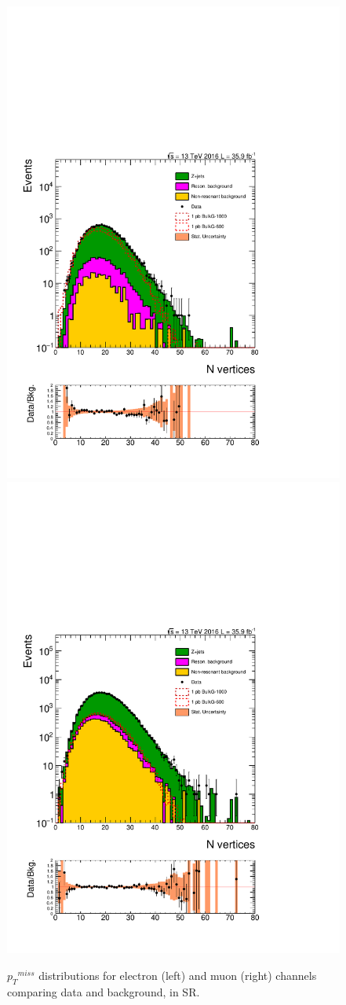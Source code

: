 \begin{figure}[htbp!]
\centering
\includegraphics[width=0.46\linewidth,page=16]{figures/ReMiniSummer16_DT_PhReMiniMCRcFixXsec_GMCPhPtWt_SRdPhiGT0p5_puWeightsummer16_muoneg_gjet_metfilter_unblind_el_log_1pb.pdf}
\includegraphics[width=0.46\linewidth,page=16]{figures/ReMiniSummer16_DT_PhReMiniMCRcFixXsec_GMCPhPtWt_SRdPhiGT0p5_puWeightsummer16_muoneg_gjet_metfilter_unblind_mu_log_1pb.pdf}
\caption{${p_{T}}^{miss}$ distributions for electron (left) and muon (right) channels
comparing data and background, in SR.}
\label{fig:SR_gjet_met_wide}
\end{figure}

